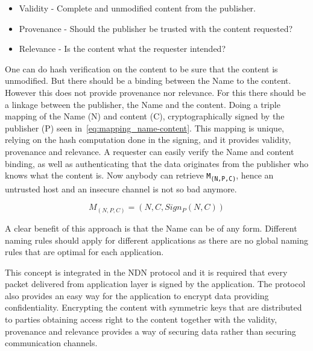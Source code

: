 \begin{itemize}
  \item Validity - Complete and unmodified content from the publisher.
  \item Provenance - Should the publisher be trusted with the content requested?
  \item Relevance - Is the content what the requester intended?
\end{itemize}

One can do hash verification on the content to be sure that the content is unmodified. 
But there should be a binding between the Name to the content.
However this does not provide provenance nor relevance.
For this there should be a linkage between the publisher, the Name and the content.
Doing a triple mapping of the Name (N) and content (C), cryptographically signed by the publisher (P) seen in~\autoref{eq:mapping_name-content}.
This mapping is unique, relying on the hash computation done in the signing, and it provides validity, provenance and relevance.
A requester can easily verify the Name and content binding, as well as authenticating that the data originates from the publisher who knows what the content is.
Now anybody can retrieve \texttt{M\textsubscript{(N,P,C)}}, hence an untrusted host and an insecure channel is not so bad anymore.

\begin{equation}\label{eq:mapping_name-content}
M_{(N, P, C)} = (N,C,Sign_{P}(N,C))
\end{equation}

A clear benefit of this approach is that the Name can be of any form. 
Different naming rules should apply for different applications as there are no global naming rules that are optimal for each application.

This concept is integrated in the \gls{NDN} protocol and it is required that every packet delivered from application layer is signed by the application.
The protocol also provides an easy way for the application to encrypt data providing confidentiality.
Encrypting the content with symmetric keys that are distributed to parties obtaining access right to the content together with the validity, provenance and relevance provides a way of securing data rather than securing communication channels.

